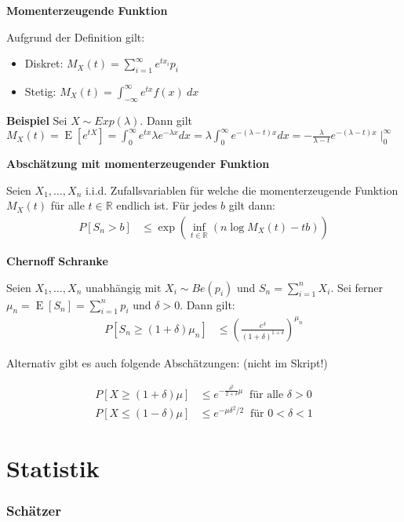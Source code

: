 \documentclass[25pt]{sciposter}
\newcommand{\R}{\mathbb{R}}
\newcommand{\E}{\operatorname{E}}
\newenvironment{method}[1]{\begin{mdframed}[backgroundcolor=blue!10,innertopmargin=15pt, innerbottommargin=15pt,nobreak=true]
		\textbf{#1 }
	}
	{ 
	\end{mdframed}
}
\begin{document}
\begin{multicols}{3}
\begin{method}{Momenterzeugende Funktion}
 Aufgrund der Definition gilt:\begin{itemize}
 	\item Diskret: $M_X(t) = \sum_{i=1}^{\infty} e^{tx_i}p_i$
 	\item Stetig: $M_X(t)= \int_{-\infty}^{\infty} e^{tx}f(x)\ dx$
 \end{itemize}
\end{method}

\textbf{Beispiel}
Sei $X \sim Exp(\lambda)$. Dann gilt $M_X(t) = \E[e^{tX}] = \int_{0}^{\infty} e^{tx} \lambda e^{-\lambda x} dx = \lambda \int_{0}^{\infty}e^{-(\lambda-t)x} dx = - \frac{\lambda}{\lambda - t} e^{-(\lambda -t)x}\mid_0^\infty$
\begin{method}{Abschätzung mit momenterzeugender Funktion}
Seien $X_1,\ldots,X_n$ i.i.d. Zufallsvariablen für welche die momenterzeugende Funktion $M_X(t)$ für alle $t\in \R$ endlich ist. Für jedes $b$ gilt dann:
\begin{align*}
	P[S_n > b] &\leq \exp \left( \inf_{t\in\R} \left(  n\log M_X(t) - tb \right)  \right)
\end{align*}
\end{method}


\begin{method}{Chernoff Schranke}
	Seien $X_1,\ldots,X_n$ unabhängig mit $X_i \sim Be(p_i)$ und $S_n = \sum_{i=1}^{n}X_i$. Sei ferner $\mu_n = \E[S_n] = \sum_{i=1}^{n} p_i$ und $\delta > 0$. Dann gilt:
	\begin{align*}
		P[S_n \geq (1+\delta)\mu_n] &\leq \left(\frac{e^\delta}{(1+\delta)^{1+\delta}}\right)^{\mu_n}
	\end{align*}
\end{method}

Alternativ gibt es auch folgende Abschätzungen: (nicht im Skript!)

\begin{align*}
	P[X \geq (1+\delta)\mu] &\leq e^{-\frac{\delta^2}{2+\delta}\mu} \ \text{ für alle } \delta > 0  \\
	P[X \leq (1-\delta)\mu] &\leq e^{-\mu\delta^2/2} \ \text{ für } 0 < \delta < 1
\end{align*}



\part{Statistik}

\section{Schätzer}

\end{multicols}
\end{document}
